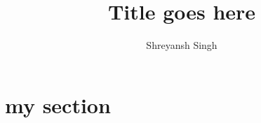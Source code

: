 \documentclass{article}
\title{Title goes here}
\author{Shreyansh Singh}
\begin{document}
\section{my section}
\end{document}
